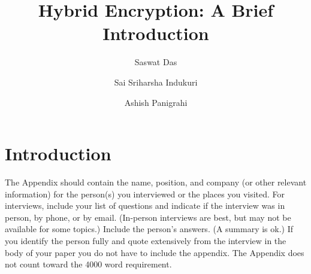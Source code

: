 \documentclass[journal]{IEEEtran}
\begin{document}
\title{Hybrid Encryption: A Brief Introduction}

\author[1]{Saswat Das}%
\author[2]{Sai Sriharsha Indukuri}
\author[3]{Ashish Panigrahi}%

\maketitle


\section{Introduction }





\appendix
The Appendix should contain the name, position, and company (or other relevant information) for the person(s) you interviewed or the places you visited.
For interviews, include your list of questions and indicate if the interview was in person, by phone, or by email.
(In-person interviews are best, but may not be available for some topics.) Include the person's answers.
(A summary is ok.) If you identify the person fully and quote extensively from the interview in the body of your paper you do not have to include the appendix.
The Appendix does not count toward the 4000 word requirement.
\end{document}
